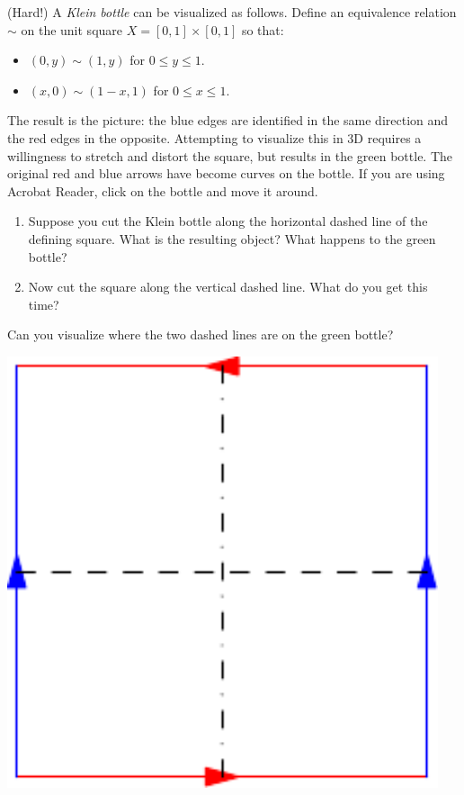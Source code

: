 \begin{enumerate}
	\noindent\begin{minipage}{0.7\textwidth}
	\item (Hard!) A \emph{Klein bottle} can be visualized as follows. Define an equivalence relation $\sim$ on the unit square $X=[0,1]\times[0,1]$ so that:
	\begin{itemize}
	  \item $(0,y)\sim (1,y)$ for $0\le y\le 1$.
	  \item $(x,0)\sim(1-x,1)$ for $0\le x\le 1$.
	\end{itemize}
	The result is the picture: the blue edges are identified in the same direction and the red edges in the opposite. Attempting to visualize this in 3D requires a willingness to stretch and distort the square, but results in the green bottle. The original red and blue arrows have become curves on the bottle. If you are using Acrobat Reader, click on the bottle and move it around.
	\begin{enumerate}
	  \item Suppose you cut the Klein bottle along the horizontal dashed line of the defining square. What is the resulting object? What happens to the green bottle?
	  \item Now cut the square along the vertical dashed line. What do you get this time?
	\end{enumerate}
	Can you visualize where the two dashed lines are on the green bottle?
	\end{minipage}\qquad
	\begin{minipage}{0.2\textwidth}
	\includegraphics[width=0.95\textwidth]{relations-hw01-kleinsquare}\\[5pt]

\end{minipage}
\end{enumerate}
